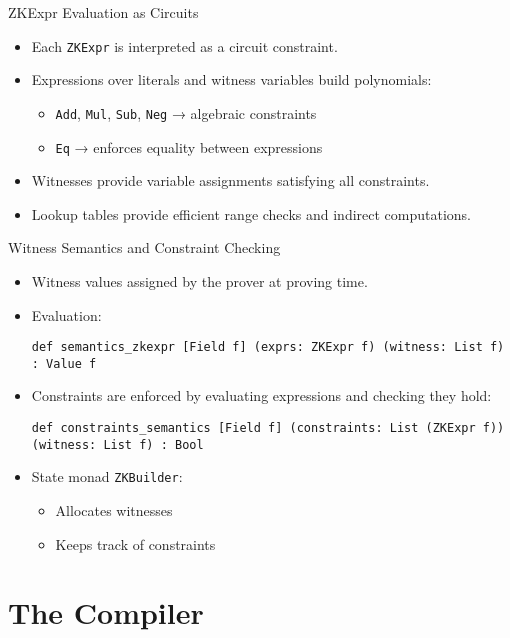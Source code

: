 \documentclass[aspectratio=169]{beamer}
\begin{document}
\begin{frame}[fragile]{ZKExpr Evaluation as Circuits}
\begin{itemize}
    \item Each \texttt{ZKExpr} is interpreted as a circuit constraint.
    \item Expressions over literals and witness variables build polynomials:
    \begin{itemize}
        \item \texttt{Add}, \texttt{Mul}, \texttt{Sub}, \texttt{Neg} → algebraic constraints
        \item \texttt{Eq} → enforces equality between expressions
    \end{itemize}
    \item Witnesses provide variable assignments satisfying all constraints.
    \item Lookup tables provide efficient range checks and indirect computations.
\end{itemize}
\end{frame}

\begin{frame}[fragile]{Witness Semantics and Constraint Checking}
\begin{itemize}
    \item Witness values assigned by the prover at proving time.
    \item Evaluation:
    \begin{lstlisting}
def semantics_zkexpr [Field f] (exprs: ZKExpr f) (witness: List f) : Value f
    \end{lstlisting}\item Constraints are enforced by evaluating expressions and checking they hold:
    \begin{lstlisting}
def constraints_semantics [Field f] (constraints: List (ZKExpr f)) (witness: List f) : Bool
    \end{lstlisting}
    \item State monad \texttt{ZKBuilder}:
    \begin{itemize}
        \item Allocates witnesses
        \item Keeps track of constraints
    \end{itemize}
\end{itemize}
\end{frame}

\section{The Compiler}
\end{document}
